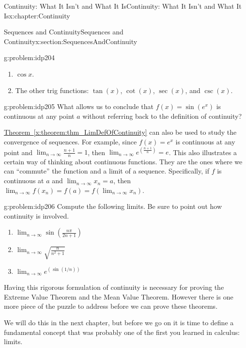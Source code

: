 \begin{chapterptx}{Continuity: What It Isn't and What It Is}{}{Continuity: What It Isn't and What It Is}{}{}{x:chapter:Continuity}
\begin{sectionptx}{Sequences and Continuity}{}{Sequences and Continuity}{}{}{x:section:SequencesAndContinuity}
\begin{problem}{}{g:problem:idp204}
\begin{enumerate}[font=\bfseries,label=(\alph*),ref=\alph*]
				\item{}\(\cos x\).%
				\item{}The other trig functions: \(\tan(x)\), \(\cot(x)\), \(\sec(x)\), and \(\csc(x)\).%
			\end{enumerate}
		\end{problem}
		\begin{problem}{}{g:problem:idp205}%
			What allows us to conclude that \(f(x)=\sin\left(e^x\right)\) is continuous at any point \(a\) without referring back to the definition of continuity?%
		\end{problem}
		\hyperref[x:theorem:thm_LimDefOfContinuity]{Theorem~{\xreffont\ref{x:theorem:thm_LimDefOfContinuity}}} can also be used to study the convergence of sequences.  For example, since \(f(x)=e^x\) is continuous at any point and \(\lim_{n\rightarrow\infty}\frac{n+1}{n}=1\), then \(\lim_{n\rightarrow\infty}e^{\left(\frac{n+1}{n}\right)}=e\). This also illustrates a certain way of thinking about continuous functions.  They are the ones where we can ``commute'' the function and a limit of a sequence.  Specifically, if \(f\) is continuous at \(a\) and \(\lim_{n\rightarrow\infty}x_n=a\), then \(\lim_{n\rightarrow\infty}f(x_n)=f(a)=f\left(\lim_{n\rightarrow\infty}x_n\right)\).%
		\begin{problem}{}{g:problem:idp206}%
			Compute the following limits. Be sure to point out how continuity is involved.%
			\begin{enumerate}[font=\bfseries,label=(\alph*),ref=\alph*]
				\item{}\(\displaystyle\lim_{n\rightarrow\infty}\sin\left(\frac{n\pi}{2n+1}\right)\)%
				\item{}\(\displaystyle\lim_{n\rightarrow\infty}\sqrt{\frac{n}{n^2+1}}\)%
				\item{}\(\displaystyle\lim_{n\rightarrow\infty}e^{\left(\text{ sin } \left(1/n\right)\right)}\)%
			\end{enumerate}
		\end{problem}
		Having this rigorous formulation of continuity is necessary for proving the Extreme Value Theorem and the Mean Value Theorem. However there is one more piece of the puzzle to address before we can prove these theorems.%
		\par
		We will do this in the next chapter, but before we go on it is time to define a fundamental concept that was probably one of the first you learned in calculus: limits.%
	\end{sectionptx}
	\typeout{************************************************}

\end{chapterptx}
